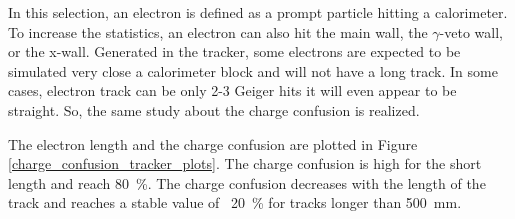 \documentclass[main.tex]{subfiles}
\begin{document}
\noindent In this selection, an electron is defined as a prompt particle hitting a calorimeter. To increase the statistics, an electron can also hit the main wall, the $\gamma$-veto wall, or the x-wall. Generated in the tracker, some electrons are expected to be simulated very close a calorimeter block and will not have a long track. In some cases, electron track can be only 2-3 Geiger hits it will even appear to be straight. So, the same study about the charge confusion is realized.


\bigskip


\noindent The electron length and the charge confusion are plotted in Figure \ref{charge_confusion_tracker_plots}. The charge confusion is high for the short length and reach 80~\%. The charge confusion decreases with the length of the track and reaches a stable value of ~20~\% for tracks longer than 500~mm.
\end{document}
